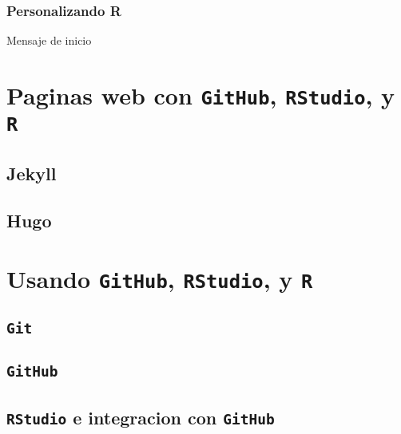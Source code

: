 \documentclass[
]{book}
\begin{document}
\hypertarget{personalizando-r}{%
\subsection{Personalizando R}\label{personalizando-r}}

Mensaje de inicio

\hypertarget{paginas-web-con-github-rstudio-y-r}{%
\chapter{\texorpdfstring{Paginas web con \texttt{GitHub}, \texttt{RStudio}, y \texttt{R}}{Paginas web con GitHub, RStudio, y R}}\label{paginas-web-con-github-rstudio-y-r}}

\hypertarget{jekyll}{%
\section{Jekyll}\label{jekyll}}

\hypertarget{hugo}{%
\section{Hugo}\label{hugo}}

\hypertarget{usando-github-rstudio-y-r}{%
\chapter{\texorpdfstring{Usando \texttt{GitHub}, \texttt{RStudio}, y \texttt{R}}{Usando GitHub, RStudio, y R}}\label{usando-github-rstudio-y-r}}

\hypertarget{git}{%
\section{\texorpdfstring{\texttt{Git}}{Git}}\label{git}}

\hypertarget{github}{%
\section{\texorpdfstring{\texttt{GitHub}}{GitHub}}\label{github}}

\hypertarget{rstudio-e-integracion-con-github}{%
\section{\texorpdfstring{\texttt{RStudio} e integracion con \texttt{GitHub}}{RStudio e integracion con GitHub}}\label{rstudio-e-integracion-con-github}}
\end{document}
